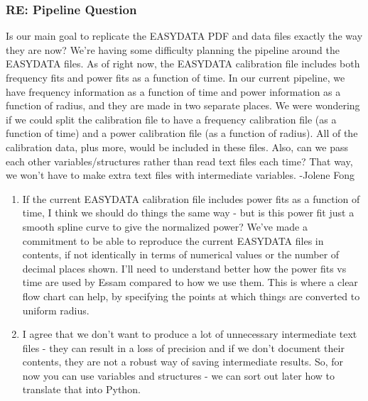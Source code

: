\documentclass[crop=false,class=article,oneside]{standalone}
\begin{document}
\subsubsection{\footnotesize RE: Pipeline Question}
Is our main goal to replicate the EASYDATA PDF and data files exactly the way they are now? We’re having some difficulty planning the pipeline around the EASYDATA files. As of right now, the EASYDATA calibration file includes both frequency fits and power fits as a function of time. In our current pipeline, we have frequency information as a function of time and power information as a function of radius, and they are made in two separate places. We were wondering if we could split the calibration file to have a frequency calibration file (as a function of time) and a power calibration file (as a function of radius). All of the calibration data, plus more, would be included in these files. Also, can we pass each other variables/structures rather than read text files each time? That way, we won’t have to make extra text files with intermediate variables. -Jolene Fong
\begin{enumerate}
    \item If the current EASYDATA calibration file includes power fits as a function of time, I think we should do things the same way - but is this power fit just a smooth spline curve to give the normalized power? We've made a commitment to be able to reproduce the current EASYDATA files in contents, if not identically in terms of numerical values or the number of decimal places shown. I'll need to understand better how the power fits vs time are used by Essam compared to how we use them. This is where a clear flow chart can help, by specifying the points at which things are converted to uniform radius.
    \item I agree that we don't want to produce a lot of unnecessary intermediate text files - they can result in a loss of precision and if we don't document their contents, they are not a robust way of saving intermediate results. So, for now you can use variables and structures - we can sort out later how to translate that into Python.
\end{enumerate}
\end{document}
